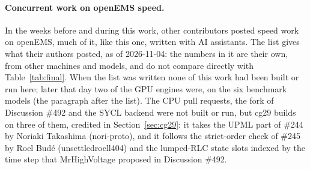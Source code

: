 \paragraph{Concurrent work on openEMS speed.} In the weeks before and during this work, other contributors posted
speed work on openEMS, much of it, like this one, written with AI assistants. The list gives what their authors
posted, as of 2026-11-04: the numbers in it are their own, from other machines and models, and do not compare directly
with Table~\ref{tab:final}. When the list was written none of this work had been built or run here; later that day
two of the GPU engines were, on the six benchmark models (the paragraph after the list). The CPU pull requests, the
fork of Discussion \#492 and the SYCL backend were not built or run, but cg29 builds on three of them, credited in
Section~\ref{sec:cg29}: it takes the UPML part of \#244 by Noriaki Takashima (nori-proto), and it follows the
strict-order check of \#245 by Roel Bud\'e (unsettledroell404) and the lumped-RLC state slots indexed by the time step
that MrHighVoltage proposed in Discussion \#492.
